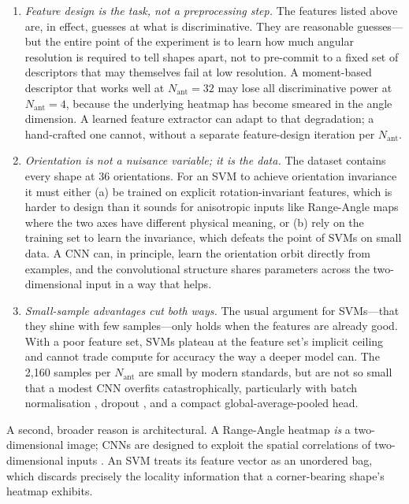 \documentclass[letterpaper,11pt,leqno]{article}
\begin{document}
\begin{enumerate}
\item \emph{Feature design is the task, not a preprocessing step.} The features listed above are, in effect, guesses at what is discriminative. They are reasonable guesses---but the entire point of the experiment is to learn how much angular resolution is required to tell shapes apart, not to pre-commit to a fixed set of descriptors that may themselves fail at low resolution. A moment-based descriptor that works well at $N_{\mathrm{ant}}=32$ may lose all discriminative power at $N_{\mathrm{ant}}=4$, because the underlying heatmap has become smeared in the angle dimension. A learned feature extractor can adapt to that degradation; a hand-crafted one cannot, without a separate feature-design iteration per $N_{\mathrm{ant}}$.
\item \emph{Orientation is not a nuisance variable; it \emph{is} the data.} The dataset contains every shape at 36 orientations. For an SVM to achieve orientation invariance it must either (a) be trained on explicit rotation-invariant features, which is harder to design than it sounds for anisotropic inputs like Range-Angle maps where the two axes have different physical meaning, or (b) rely on the training set to learn the invariance, which defeats the point of SVMs on small data. A CNN can, in principle, learn the orientation orbit directly from examples, and the convolutional structure shares parameters across the two-dimensional input in a way that helps.
\item \emph{Small-sample advantages cut both ways.} The usual argument for SVMs---that they shine with few samples---only holds when the features are already good. With a poor feature set, SVMs plateau at the feature set's implicit ceiling and cannot trade compute for accuracy the way a deeper model can. The 2{,}160 samples per $N_{\mathrm{ant}}$ are small by modern standards, but are not so small that a modest CNN overfits catastrophically, particularly with batch normalisation \citep{Ioffe15}, dropout \citep{Srivastava14}, and a compact global-average-pooled head.
\end{enumerate}

A second, broader reason is architectural. A Range-Angle heatmap \emph{is} a two-dimensional image; CNNs are designed to exploit the spatial correlations of two-dimensional inputs \citep{LeCun89}. An SVM treats its feature vector as an unordered bag, which discards precisely the locality information that a corner-bearing shape's heatmap exhibits.
\end{document}

